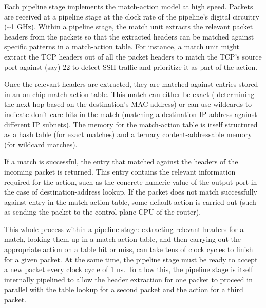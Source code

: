  Each pipeline stage implements
the match-action model at high speed. Packets are received at a pipeline stage
at the clock rate of the pipeline's digital circuitry (\textasciitilde1 GHz).
Within a pipeline stage, the match unit extracts the relevant packet headers
from the packets so that the extracted headers can be matched against specific
patterns in a match-action table. For instance, a match unit might extract the
TCP headers out of all the packet headers to match the TCP's source port
against (say) 22 to detect SSH traffic and prioritize it as part of the action.

Once the relevant headers are extracted, they are matched against entries
stored in an on-chip match-action table. This match can either be exact (\eg
determining the next hop based on the destination's MAC address) or can use
wildcards to indicate don't-care bits in the match (\eg matching a destination
IP address against different IP subnets). The memory for the match-action table
is itself structured as a hash table (for exact matches) and a ternary
content-addressable memory (for wildcard matches).

If a match is successful, the entry that matched against the headers of the
incoming packet is returned. This entry contains the relevant information
required for the action, such as the concrete numeric value of the output port
in the case of destination-address lookup. If the packet does not match
successfully against entry in the match-action table, some default action is
carried out (such as sending the packet to the control plane CPU of the
router).

This whole process within a pipeline stage: extracting relevant headers for a
match, looking them up in a match-action table, and then carrying out the
appropriate action on a table hit or miss, can take tens of clock cycles to
finish for a given packet. At the same time, the pipeline stage must be ready
to accept a new packet every clock cycle of 1 ns. To allow this, the pipeline
stage is itself internally pipelined to allow the header extraction for one
packet to proceed in parallel with the table lookup for a second packet and the
action for a third packet.



